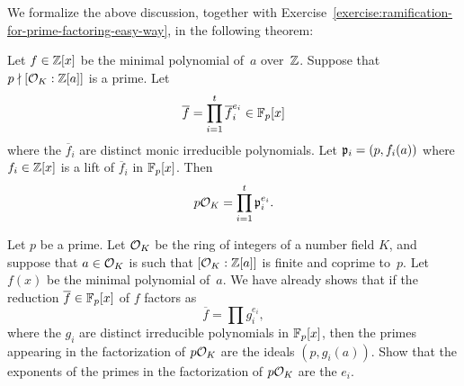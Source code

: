 We formalize the above discussion, together with
Exercise~\ref{exercise:ramification-for-prime-factoring-easy-way},
in the following theorem:
\begin{theorem}\label{thm:fac1}
	Let $f\in\mathbb{Z}[x]$ be the minimal polynomial of~$a$ over~$\mathbb{Z}$.
	Suppose that~$p\nmid [\mathcal{O}_K:\mathbb{Z}[a]]$ is a prime. Let
	$$
		\overline{f} = \prod_{i=1}^t \overline{f}_i^{e_i} \in \mathbb{F}_p[x]
	$$
	where the $\overline{f}_i$ are distinct monic irreducible
	polynomials. Let $\mathfrak{p}_i = (p,f_i(a))$ where $f_i\in\mathbb{Z}[x]$ is a
	lift of $\overline{f}_i$ in $\mathbb{F}_p[x]$. Then
	$$
		p\mathcal{O}_K = \prod_{i=1}^t \mathfrak{p}_i^{e_i}.
	$$
\end{theorem}

\begin{exercise}\label{exercise:ramification-for-prime-factoring-easy-way}
	Let $p$ be a prime. Let $\mathcal{O}_K$ be the ring of integers of a number
	field $K$, and suppose that $a\in \mathcal{O}_K$ is such that $[\mathcal{O}_K:\mathbb{Z}[a]]$ is
	finite and coprime to~$p$. Let $f(x)$ be the minimal polynomial of~$a$.
	We have already shows that if the reduction $\overline{f}\in\mathbb{F}_p[x]$ of $f$
	factors as
	$$
		\overline{f} = \prod g_i^{e_i},
	$$
	where the $g_i$ are distinct irreducible polynomials in $\mathbb{F}_p[x]$,
	then the primes appearing in the factorization of $p\mathcal{O}_K$ are the
	ideals $(p,g_i(a))$. Show that the exponents of the primes in the
	factorization of $p\mathcal{O}_K$ are the $e_i$.
\end{exercise}


